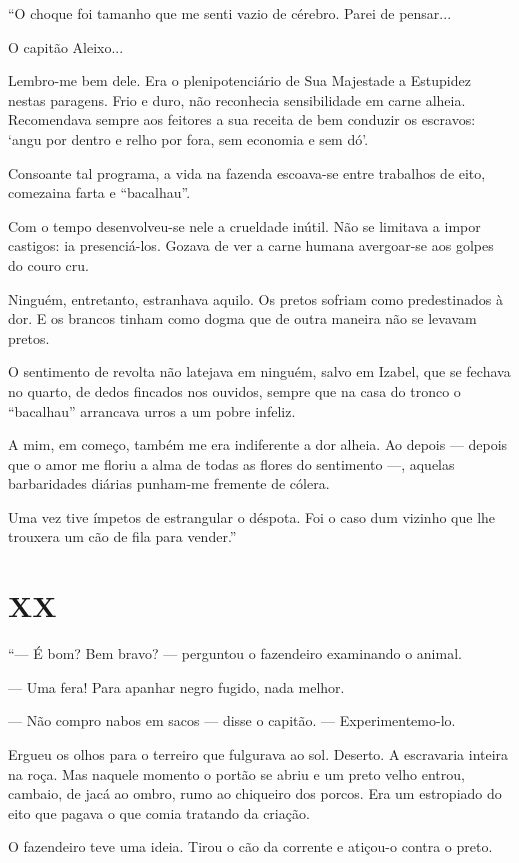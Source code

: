 ``O choque foi tamanho que me senti vazio de cérebro. Parei de pensar...

O capitão Aleixo...

Lembro-me bem dele. Era o plenipotenciário de Sua Majestade a Estupidez
nestas paragens. Frio e duro, não reconhecia sensibilidade em carne
alheia. Recomendava sempre aos feitores a sua receita de bem conduzir os
escravos: `angu por dentro e relho por fora, sem economia e sem dó'.

Consoante tal programa, a vida na fazenda escoava-se entre trabalhos de
eito, comezaina farta e ``bacalhau''.

Com o tempo desenvolveu-se nele a crueldade inútil. Não se limitava a
impor castigos: ia presenciá-los. Gozava de ver a carne humana
avergoar-se aos golpes do couro cru.

Ninguém, entretanto, estranhava aquilo. Os pretos sofriam como
predestinados à dor. E os brancos tinham como dogma que de outra maneira
não se levavam pretos.

O sentimento de revolta não latejava em ninguém, salvo em Izabel, que se
fechava no quarto, de dedos fincados nos ouvidos, sempre que na casa do
tronco o ``bacalhau'' arrancava urros a um pobre infeliz.

A mim, em começo, também me era indiferente a dor alheia. Ao depois ---
depois que o amor me floriu a alma de todas as flores do sentimento ---,
aquelas barbaridades diárias punham-me fremente de cólera.

Uma vez tive ímpetos de estrangular o déspota. Foi o caso dum vizinho
que lhe trouxera um cão de fila para vender.''

\section{XX}

``--- É bom? Bem bravo? --- perguntou o fazendeiro examinando o animal.

--- Uma fera! Para apanhar negro fugido, nada melhor.

--- Não compro nabos em sacos --- disse o capitão. --- Experimentemo-lo.

Ergueu os olhos para o terreiro que fulgurava ao sol. Deserto. A
escravaria inteira na roça. Mas naquele momento o portão se abriu e um
preto velho entrou, cambaio, de jacá ao ombro, rumo ao chiqueiro dos
porcos. Era um estropiado do eito que pagava o que comia tratando da
criação.

O fazendeiro teve uma ideia. Tirou o cão da corrente e atiçou-o contra o
preto.

